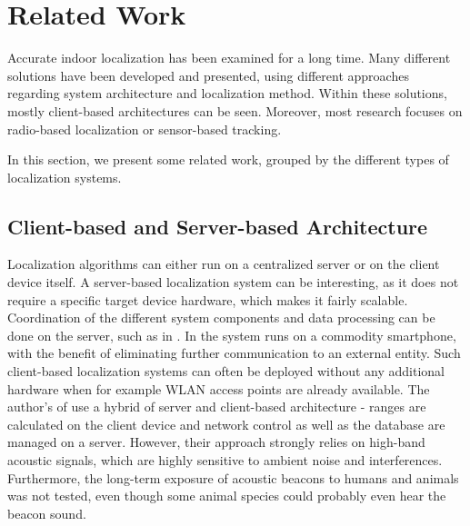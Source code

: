 
\chapter{Related Work} %

\label{Chapter2} %
Accurate indoor localization has been examined for a long time. Many different solutions have been developed and presented, using different approaches regarding system architecture and localization method. Within these solutions, mostly client-based architectures can be seen. Moreover, most research focuses on radio-based localization or sensor-based tracking.

In this section, we present some related work, grouped by the different types of localization systems.


\section{Client-based and Server-based Architecture}
Localization algorithms can either run on a centralized server or on the client device itself. A server-based localization system can be interesting, as it does not require a specific target device hardware, which makes it fairly scalable. Coordination of the different system components and data processing can be done on the server, such as in \cite{Delmastro}.
In \cite{Carrera} the system runs on a commodity smartphone, with the benefit of eliminating further communication to an external entity. Such client-based localization systems can often be deployed without any additional hardware when for example WLAN access points are already available. The author's of \cite{Guoguo} use a hybrid of server and client-based architecture - ranges are calculated on the client device and network control as well as the database are managed on a server. However, their approach strongly relies on high-band acoustic signals, which are highly sensitive to ambient noise and interferences. Furthermore, the long-term exposure of acoustic beacons to humans and animals was not tested, even though some animal species could probably even hear the beacon sound.

